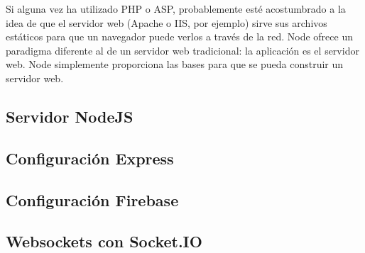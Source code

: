 Si alguna vez ha utilizado PHP o ASP, probablemente esté acostumbrado a la idea de que el servidor web (Apache o IIS, por ejemplo) sirve sus archivos estáticos para que un navegador puede verlos a través de la red. Node ofrece un paradigma diferente al de un servidor web tradicional: la aplicación es el servidor web. Node simplemente proporciona las bases para que se pueda construir un servidor web. 

\subsection{Servidor NodeJS}


\subsection{Configuración Express}


\subsection{Configuración Firebase}


\subsection{Websockets con Socket.IO}


